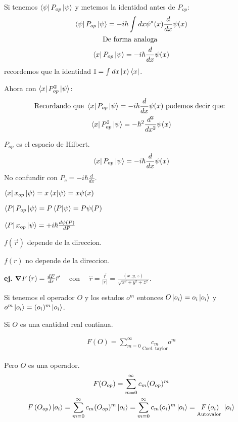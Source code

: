 \documentclass{article}
\newcommand{\caja}[3]{%
  \begin{tcolorbox}[colback=#1!5!white,colframe=#1!25!black,title=#2]
    #3
  \end{tcolorbox}%
}
\begin{document}
Si tenemos $ \bra{\psi}P _{op } \ket{\psi}  $ y metemos la identidad antes de $ P _{op }  $: 
\begin{gather}
  \bra{\psi}P _{op } \ket{\psi} =  - i \hbar  \int_{}^{}dx \psi ^ {* }(x)\frac{d  }{d x }\psi (x)\\
  \text{De forma analoga }\\
  \bra{x }P _{op } \ket{\psi} = -i \hbar  \frac{d  }{d x }\psi (x) 
\end{gather}
recordemos que la identidad $ \mathbb{I} = \int_{}^{}dx \ket{x }\bra{x} $.

Ahora con $ \bra{x}P _{op } ^ {2 }\ket{\psi}  $:
\begin{gather}
  \text{Recordando que } \bra{x }P _{op } \ket{\psi} = -i \hbar  \frac{d  }{d x }\psi (x) \text{ podemos decir que: }\\
  \bra{x}P _{op } ^ {2 }\ket{\psi} = - \hbar ^2 \frac{d ^2 }{d x ^2}\psi(x) 
\end{gather}

\caja{green}{Espacio de hilbert }{
  $ P _{op }  $ es el espacio de Hilbert. 
  \begin{gather}
    \bra{x }P _{op }  \ket{\psi} = - i \hbar \frac{d  }{d x }\psi (x) 
  \end{gather}
  No confundir con $ P_c = -i \hbar \frac{d  }{d x } $.
}

\hfill 

$ \bra{x }x _{op } \ket{\psi} = x \bra{x}\ket{\psi} = x \psi(x)   $

$ \bra{P }P _{op } \ket{\psi } = P \bra{P }\ket{\psi} = P \psi (P)  $

$ \bra{P }x _{op } \ket{\psi } = + i \hbar \frac{d \psi (P) }{d P}  $

\caja{black}{}{
  $ f\left(\vec r \right) $ depende de la direccion. 

  $ f\left(r\right) $ no depende de la direccion.

  \textbf{ej. }$ \grad F\left(r\right)=\frac{d F }{d r}\vec r  \quad $  con  $\quad  \hat r = \frac{\vec r }{\left|r \right|} = \frac{(x,y,z )}{\sqrt{x ^2+ y ^2 + z ^2} } $.
}

Si tenemos el operador $ O  $ y los estados $ o ^ {m } $ entonces $ O \ket{o_i } = o_i \ket{o_i } $ y $ o ^ {m }\ket{o_i } = (o_i)^ {m }\ket{o_i }$.

Si $ O  $ es una cantidad real continua. 

\begin{gather}
  F\left(O \right)=\sum_{m=0 }^{\infty}\underset{\text{Coef. taylor}}{c_m}o ^ {m }
\end{gather}

Pero $ O  $ es una operador. 
\begin{gather}
  F(O _{op } ) = \sum_{m=0 }^{\infty}c_m (O _{op } )^ {m }\\
  F\left(O _{op } \right)\ket{o_i } = \sum_{m=0 }^{\infty}c_m (O _{op } ) ^ {m }\ket{o_i } = \sum_{m=0 }^{\infty}c_m (o_i )^ {m }\ket{o_i} = \underset{\text{Autovalor }}{F\left(o_i \right)}\ket{o_i }
\end{gather}
\end{document}
